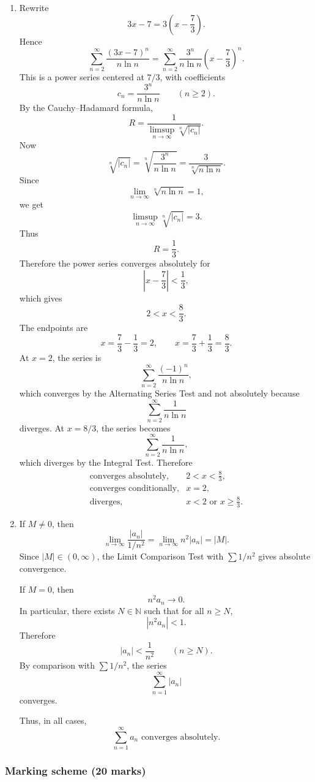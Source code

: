 \documentclass[12pt]{article}
\newcommand{\N}{\mathbb{N}}
\begin{document}
\begin{enumerate}[label=(\alph*)]
\item Rewrite
\[
3x-7=3\left(x-\frac73\right).
\]
Hence
\[
\sum_{n=2}^{\infty}\frac{(3x-7)^n}{n\ln n}
=
\sum_{n=2}^{\infty}
\frac{3^n}{n\ln n}
\left(x-\frac73\right)^n.
\]
This is a power series centered at $7/3$, with coefficients
\[
c_n=\frac{3^n}{n\ln n}
\qquad (n\ge 2).
\]
By the Cauchy--Hadamard formula,
\[
R=
\frac{1}{\limsup\limits_{n\to\infty}\sqrt[n]{|c_n|}}.
\]
Now
\[
\sqrt[n]{|c_n|}
=
\sqrt[n]{\frac{3^n}{n\ln n}}
=
\frac{3}{\sqrt[n]{n\ln n}}.
\]
Since
\[
\lim_{n\to\infty}\sqrt[n]{n\ln n}=1,
\]
we get
\[
\limsup_{n\to\infty}\sqrt[n]{|c_n|}=3.
\]
Thus
\[
R=\frac13.
\]
Therefore the power series converges absolutely for
\[
\left|x-\frac73\right|<\frac13,
\]
which gives
\[
2<x<\frac83.
\]
The endpoints are
\[
x=\frac73-\frac13=2,
\qquad
x=\frac73+\frac13=\frac83.
\]
At $x=2$, the series is
\[
\sum_{n=2}^{\infty}\frac{(-1)^n}{n\ln n},
\]
which converges by the Alternating Series Test and not absolutely because
\[
\sum_{n=2}^{\infty}\frac1{n\ln n}
\]
diverges. At $x=8/3$, the series becomes
\[
\sum_{n=2}^{\infty}\frac1{n\ln n},
\]
which diverges by the Integral Test. Therefore
\[
\boxed{
\begin{array}{ll}
\text{converges absolutely}, & 2<x<\frac83,\\[0.2em]
\text{converges conditionally}, & x=2,\\[0.2em]
\text{diverges}, & x<2\text{ or }x\ge \frac83.
\end{array}}
\]

\item If $M\ne0$, then
\[
\lim_{n\to\infty}\frac{|a_n|}{1/n^2}
=
\lim_{n\to\infty}n^2|a_n|
=
|M|.
\]
Since $|M|\in(0,\infty)$, the Limit Comparison Test with $\sum 1/n^2$ gives absolute convergence.

If $M=0$, then
\[
n^2a_n\to0.
\]
In particular, there exists $N\in\N$ such that for all $n\ge N$,
\[
|n^2a_n|<1.
\]
Therefore
\[
|a_n|<\frac1{n^2}
\qquad(n\ge N).
\]
By comparison with $\sum 1/n^2$, the series
\[
\sum_{n=1}^{\infty}|a_n|
\]
converges.

Thus, in all cases,
\[
\boxed{\sum_{n=1}^{\infty}a_n\text{ converges absolutely}.}
\]
\end{enumerate}

\subsubsection{Marking scheme (20 marks)}
\end{document}
